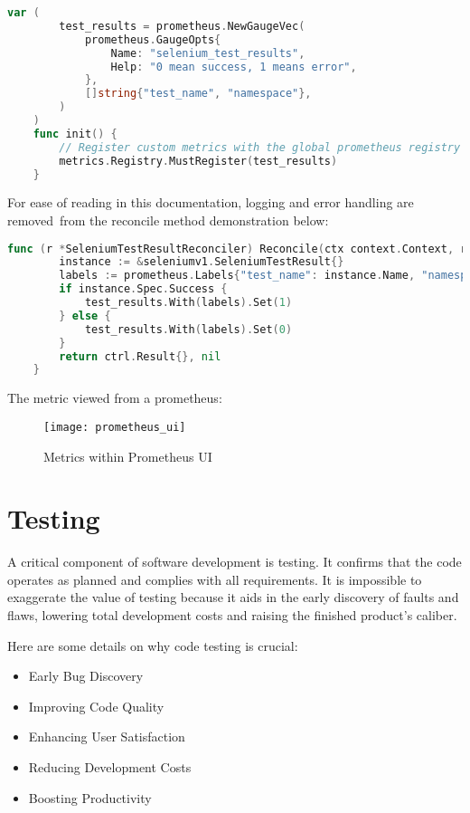 \begin{lstlisting}[language={Go}]
	var (
		test_results = prometheus.NewGaugeVec(
			prometheus.GaugeOpts{
				Name: "selenium_test_results",
				Help: "0 mean success, 1 means error",
			},
			[]string{"test_name", "namespace"},
		)
	)
	func init() {
		// Register custom metrics with the global prometheus registry
		metrics.Registry.MustRegister(test_results)
	}
\end{lstlisting}

For ease of reading in this documentation, logging and error handling are removed from the reconcile method demonstration below:

\begin{lstlisting}[language={Go}]
	func (r *SeleniumTestResultReconciler) Reconcile(ctx context.Context, req ctrl.Request) (ctrl.Result, error) {
		instance := &seleniumv1.SeleniumTestResult{}
		labels := prometheus.Labels{"test_name": instance.Name, "namespace": instance.Namespace}
		if instance.Spec.Success {
			test_results.With(labels).Set(1)
		} else {
			test_results.With(labels).Set(0)
		}
		return ctrl.Result{}, nil
	}
\end{lstlisting}

The metric viewed from a prometheus:

\begin{figure}[H]
	\centering
	\texttt{[image: prometheus\_ui]}
	\label{fig:prometheus_ui}
	\caption{Metrics within Prometheus UI}
\end{figure}

\section{Testing}

A critical component of software development is testing. It confirms that the code operates as planned and complies with all requirements. It is impossible to exaggerate the value of testing because it aids in the early discovery of faults and flaws, lowering total development costs and raising the finished product's caliber.

Here are some details on why code testing is crucial:

\begin{itemize}
	\item Early Bug Discovery
	\item Improving Code Quality
	\item Enhancing User Satisfaction
	\item Reducing Development Costs
	\item Boosting Productivity
\end{itemize}

